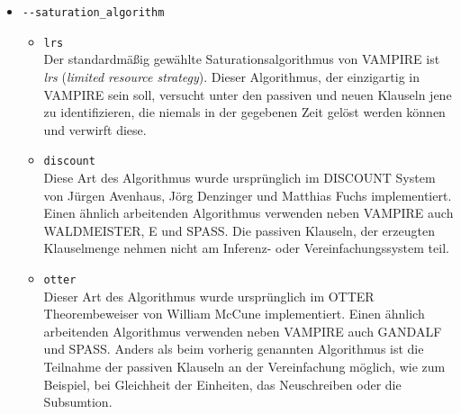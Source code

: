 \documentclass{article}
\begin{document}
\begin{itemize}
\item \verb|--saturation_algorithm| \label{arg:saturationalgorithm}
\begin{itemize}
	\item \verb|lrs|\\
	Der standardmäßig gewählte Saturationsalgorithmus von VAMPIRE ist \emph{lrs} (\emph{limited resource strategy}).
	Dieser Algorithmus, der einzigartig in VAMPIRE sein soll, versucht unter den passiven und neuen Klauseln jene zu identifizieren, die niemals in der gegebenen Zeit gelöst werden können und verwirft diese. \cite{riazanov2003limited}
	\item \verb|discount|\\
	Diese Art des Algorithmus wurde ursprünglich im DISCOUNT System von Jürgen Avenhaus, Jörg Denzinger und Matthias Fuchs implementiert.
	Einen ähnlich arbeitenden Algorithmus verwenden neben VAMPIRE auch WALDMEISTER, E und SPASS. 
	Die passiven Klauseln, der erzeugten Klauselmenge nehmen nicht am Inferenz- oder Vereinfachungssystem teil. \cite{riazanov2003limited} 
	\item \verb|otter|\\
	Dieser Art des Algorithmus wurde ursprünglich im OTTER Theorembeweiser von William McCune implementiert.
	Einen ähnlich arbeitenden Algorithmus verwenden neben VAMPIRE auch GANDALF und SPASS. 
	Anders als beim vorherig genannten Algorithmus ist die Teilnahme der passiven Klauseln an der Vereinfachung möglich, wie zum Beispiel, bei Gleichheit der Einheiten, das Neuschreiben oder die Subsumtion. \cite{riazanov2003limited} 
\end{itemize}


\end{itemize}
\end{document}
